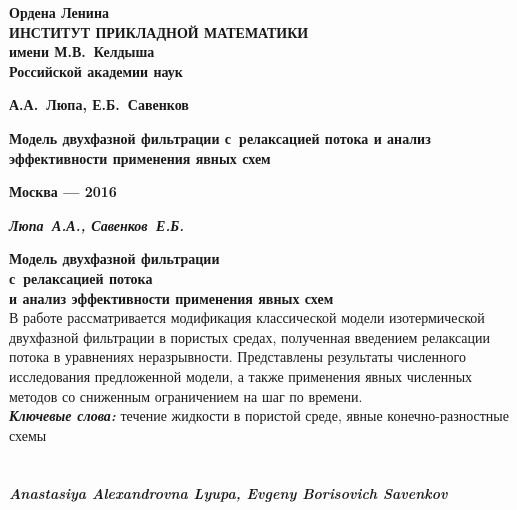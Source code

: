 \begin{titlepage}
\begin{center}

{\bf Ордена Ленина \\
ИНСТИТУТ ПРИКЛАДНОЙ МАТЕМАТИКИ \\
имени М.В.~Келдыша \\
Российской академии наук \\
\par}

\vspace{50mm}

{\bf \large А.А.~Люпа, Е.Б.~Савенков\par}

\vspace{10mm}

{\bf \Large Модель двухфазной фильтрации с~релаксацией потока
и анализ эффективности применения явных схем
\par}

\end{center}

\vspace{\fill}

\begin{center}
{\bf Москва --- 2016}
\end{center}

\clearpage
\end{titlepage}
\newpage

{\noindent \textit{ \textbf {Люпа~А.А., Савенков~Е.Б.}}}


{\bf Модель двухфазной фильтрации \\ с~релаксацией потока \\
и анализ эффективности применения явных схем} \\


В работе рассматривается модификация классической модели
изотермической двухфазной фильтрации в пористых средах, полученная 
введением релаксации потока в уравнениях неразрывности.
Представлены результаты численного исследования предложенной модели,
а также применения явных численных методов со сниженным ограничением на
шаг по времени. \\


{\textit{ \textbf {Ключевые слова:}}} течение жидкости в пористой среде, явные конечно-разностные схемы \\ \\ \\


{\noindent \textit{ \textbf { Anastasiya Alexandrovna Lyupa, Evgeny Borisovich Savenkov}}}


